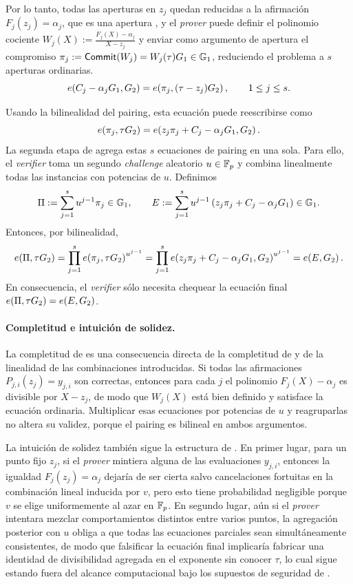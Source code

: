 Por lo tanto, todas las aperturas en $z_j$ quedan reducidas a la afirmación $F_j(z_j) = \alpha_j$, que es una apertura \KZG, y el \textit{prover} puede definir el polinomio cociente $W_j(X) := \frac{F_j(X) - \alpha_j}{X - z_j}$
y enviar como argumento de apertura el compromiso $\pi_j := \mathsf{Commit}(W_j) = W_j(\tau)G_1 \in \mathbb{G}_1$, reduciendo el problema a $s$ aperturas \KZG ordinarias.
$$e\!\left(C_j - \alpha_j G_1,G_2\right) = e\!\left(\pi_j,(\tau - z_j)G_2\right), \qquad 1 \leq j \leq s.$$

Usando la bilinealidad del pairing, esta ecuación puede reescribirse como
$$e\!\left(\pi_j,\tau G_2\right) = e\!\left(z_j\pi_j + C_j - \alpha_j G_1,G_2\right).$$
La segunda etapa de \GWCNineteen agrega estas $s$ ecuaciones de pairing en una sola. Para ello, el \textit{verifier} toma un segundo \textit{challenge} aleatorio $u \in \mathbb{F}_p$ y combina linealmente todas las instancias con potencias de $u$. Definimos
$$\Pi := \sum_{j=1}^{s} u^{j-1}\pi_j \in \mathbb{G}_1, \qquad E := \sum_{j=1}^{s} u^{j-1}\left(z_j\pi_j + C_j - \alpha_j G_1\right) \in \mathbb{G}_1.$$
Entonces, por bilinealidad,
$$e\!\left(\Pi,\tau G_2\right) = \prod_{j=1}^{s} e\!\left(\pi_j,\tau G_2\right)^{u^{j-1}} = \prod_{j=1}^{s} e\!\left(z_j\pi_j + C_j - \alpha_j G_1,G_2\right)^{u^{j-1}} = e\!\left(E,G_2\right). $$
En consecuencia, el \textit{verifier} sólo necesita chequear la ecuación final $e\!\left(\Pi,\tau G_2\right) = e\!\left(E,G_2\right)$.

\paragraph{Completitud e intuición de solidez.}
La completitud de \GWCNineteen es una consecuencia directa de la completitud de \KZG y de la linealidad de las combinaciones introducidas. Si todas las afirmaciones $P_{j,i}(z_j) = y_{j,i}$ son correctas, entonces para cada $j$ el polinomio $F_j(X) - \alpha_j$ es divisible por $X - z_j$, de modo que $W_j(X)$ está bien definido y satisface la ecuación \KZG ordinaria. Multiplicar esas ecuaciones por potencias de $u$ y reagruparlas no altera su validez, porque el pairing es bilineal en ambos argumentos.

La intuición de solidez también sigue la estructura de \KZG. En primer lugar, para un punto fijo $z_j$, si el \textit{prover} mintiera alguna de las evaluaciones $y_{j,i}$, entonces la igualdad $F_j(z_j) = \alpha_j$ dejaría de ser cierta salvo cancelaciones fortuitas en la combinación lineal inducida por $v$, pero esto tiene probabilidad negligible porque $v$ se elige uniformemente al azar en $\mathbb{F}_p$. En segundo lugar, aún si el \textit{prover} intentara mezclar comportamientos distintos entre varios puntos, la agregación posterior con $u$ obliga a que todas las ecuaciones parciales sean simultáneamente consistentes, de modo que falsificar la ecuación final implicaría fabricar una identidad de divisibilidad agregada en el exponente sin conocer $\tau$, lo cual sigue estando fuera del alcance computacional bajo los supuestos de seguridad de \KZG.

